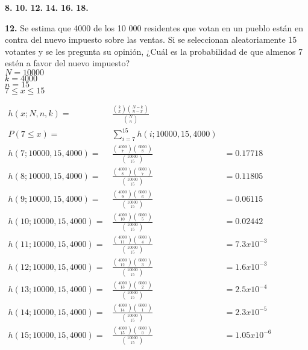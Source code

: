 \documentclass[12pt, letterpaper]{article}
\begin{document}
    \textbf{8. }\vskip1cm
    \textbf{10. }\vskip1cm
    \textbf{12. }\vskip1cm
    \textbf{14. }\vskip1cm
    \textbf{16. }\vskip1cm
    \textbf{18. }\vskip1cm

    \textbf{12.} Se estima que 4000 de los 10 000 residentes que votan en un pueblo est\'an en contra del nuevo impuesto sobre las ventas. Si se seleccionan aleatoriamente 15 votantes y se les pregunta su opini\'on, ¿Cu\'al es la probabilidad de que almenos 7 est\'en a favor del nuevo impuesto?\\
    $N=10000$\\
    $k=4000$\\
    $n=15$\\
    $7\leq x \leq 15$\\
    \begin{center}
        \begin{math}
            \begin{array}{ccc}
                h(x;N,n,k)=&\displaystyle\frac{{\displaystyle\binom{k}{x} \displaystyle\binom{N-k}{n-x}}}{\displaystyle\binom{N}{n}}&\\
                P(7\leq x)=&\displaystyle\sum^{15}_{i=7} h(i;10000,15,4000)&\\ 
                h(7;10000,15,4000)= & \frac{\binom{4000}{7} \binom{6000}{8}}{\binom{10000}{15}}&=0.17718\\
                h(8;10000,15,4000)= & \frac{\binom{4000}{8} \binom{6000}{7}}{\binom{10000}{15}}&=0.11805\\
                h(9;10000,15,4000)= & \frac{\binom{4000}{9} \binom{6000}{6}}{\binom{10000}{15}}&=0.06115\\
                h(10;10000,15,4000)= & \frac{\binom{4000}{10} \binom{6000}{5}}{\binom{10000}{15}}&=0.02442\\
                h(11;10000,15,4000)= & \frac{\binom{4000}{11} \binom{6000}{4}}{\binom{10000}{15}}&=7.3x10^{-3}\\
                h(12;10000,15,4000)= & \frac{\binom{4000}{12} \binom{6000}{3}}{\binom{10000}{15}}&=1.6x10^{-3}\\
                h(13;10000,15,4000)= & \frac{\binom{4000}{13} \binom{6000}{2}}{\binom{10000}{15}}&=2.5x10^{-4}\\
                h(14;10000,15,4000)= & \frac{\binom{4000}{14} \binom{6000}{1}}{\binom{10000}{15}}&=2.3x10^{-5}\\
                h(15;10000,15,4000)= & \frac{\binom{4000}{15} \binom{6000}{0}}{\binom{10000}{15}}&=1.05x10^{-6}\\

\end{array}
\end{math}
\end{center}
\end{document}
